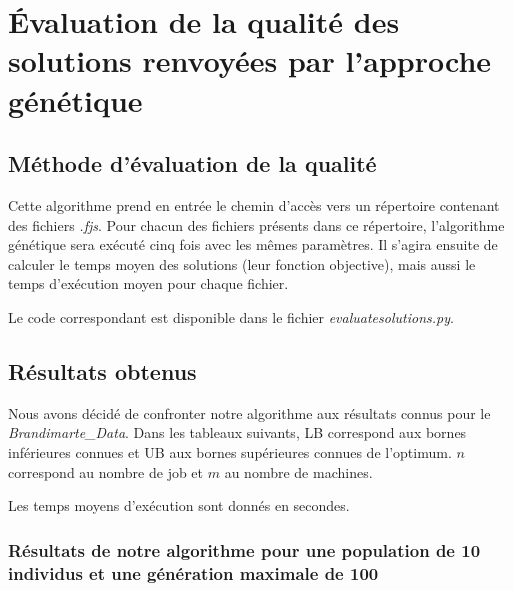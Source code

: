 \section{Évaluation de la qualité des solutions renvoyées par l'approche génétique}

\subsection{Méthode d'évaluation de la qualité}

Cette algorithme prend en entrée le chemin d'accès vers un répertoire contenant des fichiers \textit{.fjs}. Pour chacun des fichiers présents dans ce répertoire, l'algorithme génétique sera exécuté cinq fois avec les mêmes paramètres. Il s'agira ensuite de calculer le temps moyen des solutions (leur fonction objective), mais aussi le temps d'exécution moyen pour chaque fichier.

Le code correspondant est disponible dans le fichier \textit{evaluatesolutions.py}.

\subsection{Résultats obtenus}

Nous avons décidé de confronter notre algorithme aux résultats connus pour le \textit{Brandimarte\_Data}. Dans les tableaux suivants, LB correspond aux bornes inférieures connues et UB aux bornes supérieures connues de l'optimum. $n$ correspond au nombre de job et $m$ au nombre de machines.

Les temps moyens d'exécution sont donnés en secondes.

\subsubsection{Résultats de notre algorithme pour une population de 10 individus et une génération maximale de 100}

